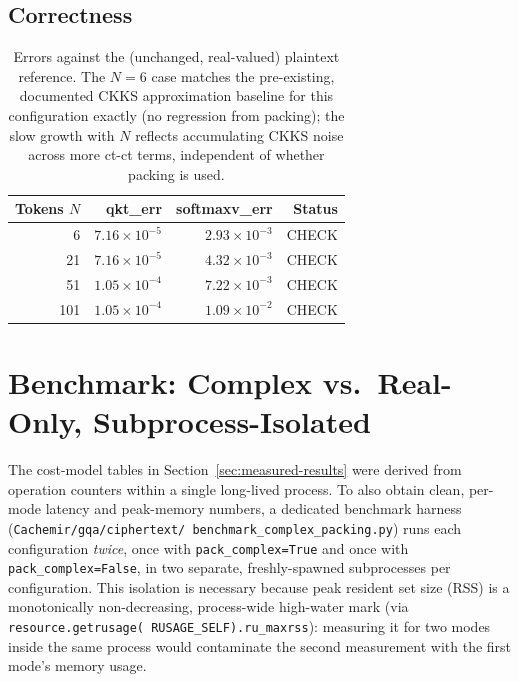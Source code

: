 \documentclass[11pt]{article}
\begin{document}
\subsection{Correctness}
\begin{table}[H]
\centering
\begin{tabular}{rrrr}
\toprule
Tokens $N$ & qkt\_err & softmaxv\_err & Status \\
\midrule
6   & $7.16\times 10^{-5}$ & $2.93\times 10^{-3}$ & CHECK \\
21  & $7.16\times 10^{-5}$ & $4.32\times 10^{-3}$ & CHECK \\
51  & $1.05\times 10^{-4}$ & $7.22\times 10^{-3}$ & CHECK \\
101 & $1.05\times 10^{-4}$ & $1.09\times 10^{-2}$ & CHECK \\
\bottomrule
\end{tabular}
\caption{Errors against the (unchanged, real-valued) plaintext reference.
The $N{=}6$ case matches the pre-existing, documented CKKS approximation
baseline for this configuration exactly (no regression from packing); the
slow growth with $N$ reflects accumulating CKKS noise across more ct-ct
terms, independent of whether packing is used.}
\end{table}

\section{Benchmark: Complex vs.\ Real-Only, Subprocess-Isolated}

The cost-model tables in Section~\ref{sec:measured-results} were derived
from operation counters within a single long-lived process. To also
obtain clean, per-mode latency and peak-memory numbers, a dedicated
benchmark harness (\texttt{Cachemir/gqa/ciphertext/\allowbreak
benchmark\_complex\_packing.py}) runs each configuration \emph{twice},
once with \texttt{pack\_complex=True} and once with
\texttt{pack\_complex=False}, in two separate, freshly-spawned
subprocesses per configuration. This isolation is necessary because
peak resident set size (RSS) is a monotonically non-decreasing,
process-wide high-water mark (via \texttt{resource.getrusage(\allowbreak
RUSAGE\_SELF).ru\_maxrss}): measuring it for two modes inside the same
process would contaminate the second measurement with the first mode's
memory usage.
\end{document}
